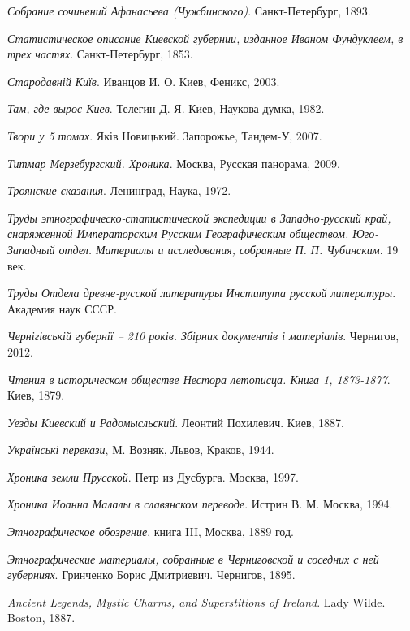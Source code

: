 \emph{Собрание сочинений Афанасьева (Чужбинского)}. Санкт-Петербург, 1893.

\emph{Статистическое описание Киевской губернии,  изданное Иваном Фундуклеем, в трех частях}. Санкт-Петербург, 1853. 

\emph{Стародавній Київ}. Иванцов И. О. Киев, Феникс, 2003.

\emph{Там, где вырос Киев}.
Телегин Д. Я. Киев, Наукова думка, 1982.

\emph{Твори у 5 томах}. Яків Новицький. Запорожье, Тандем-У, 2007.

\emph{Титмар Мерзебургский. Хроника}. Москва, Русская панорама, 2009. 

\emph{Троянские сказания}. Ленинград, Наука, 1972. 

\emph{Труды этнографическо-статистической экспедиции в Западно-русский край, снаряженной Императорским Русским Географическим обществом. Юго-Западный отдел. Материалы и исследования, собранные П. П. Чубинским}. 19 век.

\emph{Труды Отдела древне-русской литературы Института русской  литературы}. Академия наук СССР.

\emph{Чернігівській губернії – 210 років. Збірник документів і матеріалів}. Чернигов, 2012.

\emph{Чтения в историческом обществе Нестора летописца. Книга 1, 1873-1877}. Киев, 1879.

\emph{Уезды Киевский и Радомысльский}. Леонтий Похилевич. Киев, 1887.

\emph{Українські перекази}, М. Возняк, Львов, Краков, 1944.  

\emph{Хроника земли Прусской}. Петр из Дусбурга. Москва, 1997.

\emph{Хроника Иоанна Малалы в славянском переводе}. Истрин В. М. Москва, 1994.

\emph{Этнографическое обозрение}, книга III, Москва, 1889 год.

\emph{Этнографические материалы, собранные в Черниговской и соседних с ней губерниях}. Гринченко Борис Дмитриевич. Чернигов, 1895.

\emph{Ancient Legends, Mystic Charms, and Superstitions of Ireland}. Lady Wilde. Boston, 1887.

